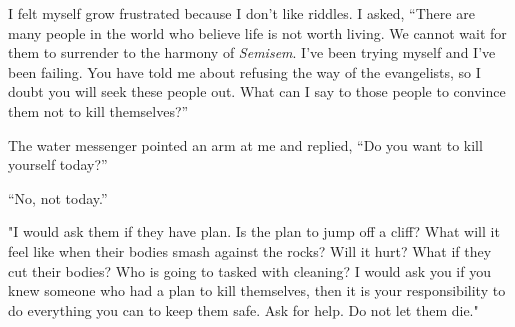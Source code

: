 \documentclass[12pt, letterpaper]{report}
\begin{document}
\vspace{1\baselineskip}
I felt myself grow frustrated because I don't like riddles. I asked, ``There are many people in the world who believe life is not worth living. We cannot wait for them to surrender to the harmony of \textit{Semisem}. I've been trying myself and I've been failing. You have told me about refusing the way of the evangelists, so I doubt you will seek these people out. What can I say to those people to convince them not to kill themselves?''

\vspace{1\baselineskip}
The water messenger pointed an arm at me and replied, ``Do you want to kill yourself today?''

\vspace{1\baselineskip}
``No, not today.''

\vspace{1\baselineskip}
"I would ask them if they have plan. Is the plan to jump off a cliff? What will it feel like when their bodies smash against the rocks? Will it hurt? What if they cut their bodies? Who is going to tasked with cleaning? I would ask you if you knew someone who had a plan to kill themselves, then it is your responsibility to do everything you can to keep them safe. Ask for help. Do not let them die."















  
  
\end{document}
